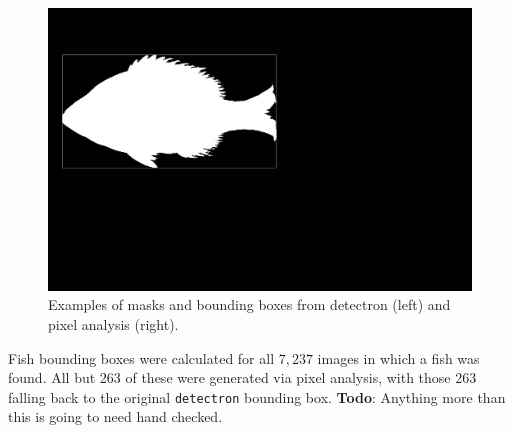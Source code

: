 \documentclass[screen,review]{acmart}
\begin{document}
\begin{figure}[H]
  \includegraphics[width=0.49\linewidth]{images/56885_mask}
  \caption{Examples of masks and bounding boxes from detectron (left) and pixel analysis (right).}
\end{figure}
Fish bounding boxes were calculated for all \(7,237\) images in which a fish was found. All but 263 of these were generated via pixel analysis, with those 263 falling back to the original \verb|detectron| bounding box. \textbf{Todo}: Anything more than this is going to need hand checked.
\end{document}
